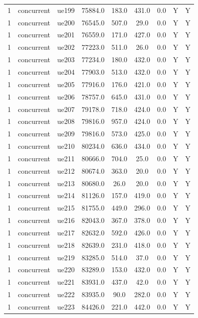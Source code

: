\begin{table}[ht]
\begin{tabular}{|c|c|c|c|c|c|c|c|c|}
1 & concurrent & ue199 & 75884.0 & 183.0 & 431.0 & 0.0 & Y & Y \\
1 & concurrent & ue200 & 76545.0 & 507.0 & 29.0 & 0.0 & Y & Y \\
1 & concurrent & ue201 & 76559.0 & 171.0 & 427.0 & 0.0 & Y & Y \\
1 & concurrent & ue202 & 77223.0 & 511.0 & 26.0 & 0.0 & Y & Y \\
1 & concurrent & ue203 & 77234.0 & 180.0 & 432.0 & 0.0 & Y & Y \\
1 & concurrent & ue204 & 77903.0 & 513.0 & 432.0 & 0.0 & Y & Y \\
1 & concurrent & ue205 & 77916.0 & 176.0 & 421.0 & 0.0 & Y & Y \\
1 & concurrent & ue206 & 78757.0 & 645.0 & 431.0 & 0.0 & Y & Y \\
1 & concurrent & ue207 & 79178.0 & 718.0 & 424.0 & 0.0 & Y & Y \\
1 & concurrent & ue208 & 79816.0 & 957.0 & 424.0 & 0.0 & Y & Y \\
1 & concurrent & ue209 & 79816.0 & 573.0 & 425.0 & 0.0 & Y & Y \\
1 & concurrent & ue210 & 80234.0 & 636.0 & 434.0 & 0.0 & Y & Y \\
1 & concurrent & ue211 & 80666.0 & 704.0 & 25.0 & 0.0 & Y & Y \\
1 & concurrent & ue212 & 80674.0 & 363.0 & 20.0 & 0.0 & Y & Y \\
1 & concurrent & ue213 & 80680.0 & 26.0 & 20.0 & 0.0 & Y & Y \\
1 & concurrent & ue214 & 81126.0 & 157.0 & 419.0 & 0.0 & Y & Y \\
1 & concurrent & ue215 & 81755.0 & 449.0 & 296.0 & 0.0 & Y & Y \\
1 & concurrent & ue216 & 82043.0 & 367.0 & 378.0 & 0.0 & Y & Y \\
1 & concurrent & ue217 & 82632.0 & 592.0 & 426.0 & 0.0 & Y & Y \\
1 & concurrent & ue218 & 82639.0 & 231.0 & 418.0 & 0.0 & Y & Y \\
1 & concurrent & ue219 & 83285.0 & 514.0 & 37.0 & 0.0 & Y & Y \\
1 & concurrent & ue220 & 83289.0 & 153.0 & 432.0 & 0.0 & Y & Y \\
1 & concurrent & ue221 & 83931.0 & 437.0 & 42.0 & 0.0 & Y & Y \\
1 & concurrent & ue222 & 83935.0 & 90.0 & 282.0 & 0.0 & Y & Y \\
1 & concurrent & ue223 & 84426.0 & 221.0 & 442.0 & 0.0 & Y & Y \\

\end{tabular}
\end{table}
